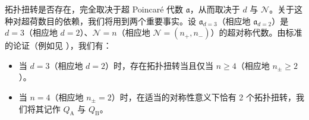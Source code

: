 拓扑扭转是否存在，完全取决于超 Poincaré 代数 $\mathfrak{a}$，从而取决于 $d$ 与 $\mathcal{N}$。关于这种对超荷数目的依赖，我们将用到两个重要事实。设 $\mathfrak{a}_{d=3}$（相应地 $\mathfrak{a}_{d=2}$）是 $d=3$（相应地 $d=2$）、$\mathcal{N}=n$（相应地 $\mathcal{N}=(n_+,n_-)$）的超对称代数。由标准的论证（例如见 \cite[\S\S 11.2 \& 12.1]{elliottTaxonomyTwists2022}），我们有：
\begin{itemize}
	\item 当 $d=3$（相应地 $d=2$）时，存在拓扑扭转当且仅当 $n\geq 4$（相应地 $n_\pm\geq 2$）。  
	\item 当 $n= 4$（相应地 $n_\pm= 2$）时，在适当的对称性意义下恰有 2 个拓扑扭转，我们将其记作 $Q_{\operatorname{A}}$ 与 $Q_{\operatorname{B}}$。
\end{itemize}

